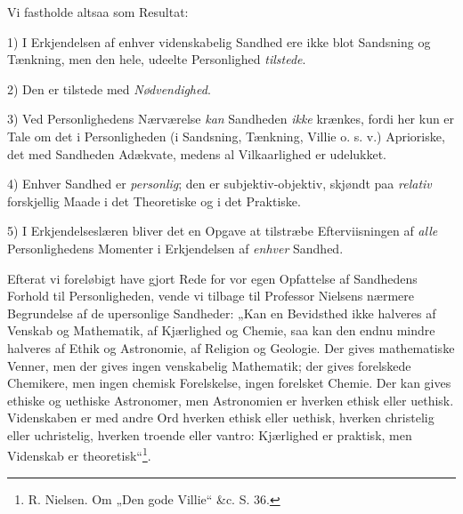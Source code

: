 \documentclass[12pt,a4paper]{book}
\newcommand{\opage}[1]{\marginnote{\footnotesize\textit{[#1]}}}
\begin{document}
Vi fastholde altsaa som Resultat:

1) I Erkjendelsen af enhver videnskabelig Sandhed
\opage{27}\setcounter{footnote}{0}%
ere ikke blot Sandsning og Tænkning, men den
hele, udeelte Personlighed \emph{tilstede}.

2) Den er tilstede med \emph{Nødvendighed}.

3) Ved Personlighedens Nærværelse \emph{kan} Sandheden \emph{ikke}
krænkes, fordi her kun er Tale om det i Personligheden
(i Sandsning, Tænkning, Villie o. s. v.)
Aprioriske, det med Sandheden Adækvate, medens
al Vilkaarlighed er udelukket.

4) Enhver Sandhed er \emph{personlig}; den er subjektiv-objektiv,
skjøndt paa \emph{relativ} forskjellig Maade i
det Theoretiske og i det Praktiske.

5) I Erkjendelseslæren bliver det en Opgave at tilstræbe
Efterviisningen af \emph{alle} Personlighedens Momenter
i Erkjendelsen af \emph{enhver} Sandhed.

Efterat vi foreløbigt have gjort Rede for vor egen
Opfattelse af Sandhedens Forhold til Personligheden,
vende vi tilbage til Professor Nielsens nærmere Begrundelse
af de upersonlige Sandheder: „Kan en Bevidsthed
ikke halveres af Venskab og Mathematik, af
Kjærlighed og Chemie, saa kan den endnu mindre halveres
af Ethik og Astronomie, af Religion og Geologie.
Der gives mathematiske Venner, men der gives ingen
venskabelig Mathematik; der gives forelskede Chemikere,
men ingen chemisk Forelskelse, ingen forelsket Chemie.
Der kan gives ethiske og uethiske Astronomer, men Astronomien
er hverken ethisk eller uethisk. Videnskaben er
med andre Ord hverken ethisk eller uethisk, hverken
christelig eller uchristelig, hverken troende eller vantro:
Kjærlighed er praktisk, men Videnskab er theoretisk“\footnote{R. Nielsen. Om „Den gode Villie“ \&c. S. 36.}.
\end{document}
